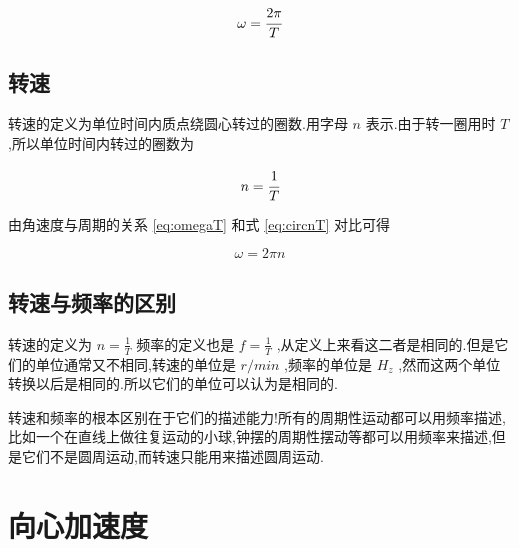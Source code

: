\begin{equation}
  \omega =\cfrac{2\pi}{T}
  \label{eq:omegaT}
\end{equation}

\subsection{转速}

转速的定义为单位时间内质点绕圆心转过的圈数.用字母 $n$ 表示.由于转一圈用时 $T$ ,所以单位时间内转过的圈数为

\begin{equation}
  n=\cfrac{1}{T}
  \label{eq:circnT}
\end{equation}

由角速度与周期的关系 \eqref{eq:omegaT} 和式 \eqref{eq:circnT} 对比可得

\begin{equation}
  \omega =2\pi n
  \label{eq:onegan}
\end{equation}

\subsection{转速与频率的区别}

转速的定义为 $n=\frac{1}{T}$ 频率的定义也是 $f=\frac{1}{T}$ ,从定义上来看这二者是相同的.但是它们的单位通常又不相同,转速的单位是 $ r/min$ ,频率的单位是 $H_z$ ,然而这两个单位转换以后是相同的.所以它们的单位可以认为是相同的.

转速和频率的根本区别在于它们的描述能力!所有的周期性运动都可以用频率描述,比如一个在直线上做往复运动的小球,钟摆的周期性摆动等都可以用频率来描述,但是它们不是圆周运动,而转速只能用来描述圆周运动.

\section{向心加速度}

